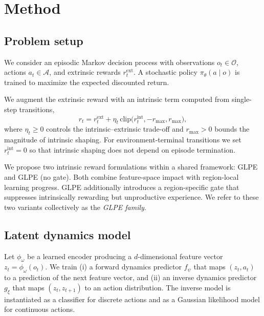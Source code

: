 \section{Method}
\label{sec:method}

\subsection{Problem setup}

We consider an episodic Markov decision process with observations $o_t \in \mathcal{O}$, actions $a_t \in \mathcal{A}$, and extrinsic rewards $r_t^{\mathrm{ext}}$.
A stochastic policy $\pi_\theta(a\mid o)$ is trained to maximize the expected discounted return.

We augment the extrinsic reward with an intrinsic term computed from single-step transitions,
\begin{equation}
    r_t = r_t^{\mathrm{ext}} + \eta_t\,\mathrm{clip}\big(r_t^{\mathrm{int}}, -r_{\max}, r_{\max}\big),
\end{equation}
where $\eta_t\ge 0$ controls the intrinsic--extrinsic trade-off and $r_{\max}>0$ bounds the magnitude of intrinsic shaping.
For environment-terminal transitions we set $r_t^{\mathrm{int}}=0$ so that intrinsic shaping does not depend on episode termination.

We propose two intrinsic reward formulations within a shared framework: GLPE and GLPE (no gate).
Both combine feature-space impact with region-local learning progress.
GLPE additionally introduces a region-specific gate that suppresses intrinsically rewarding but unproductive experience.
We refer to these two variants collectively as the \emph{GLPE family}.

\subsection{Latent dynamics model}

Let $\phi_\omega$ be a learned encoder producing a $d$-dimensional feature vector $z_t = \phi_\omega(o_t)$.
We train (i) a forward dynamics predictor $f_\psi$ that maps $(z_t,a_t)$ to a prediction of the next feature vector, and (ii) an inverse dynamics predictor $g_\xi$ that maps $(z_t,z_{t+1})$ to an action distribution.
The inverse model is instantiated as a classifier for discrete actions and as a Gaussian likelihood model for continuous actions.

